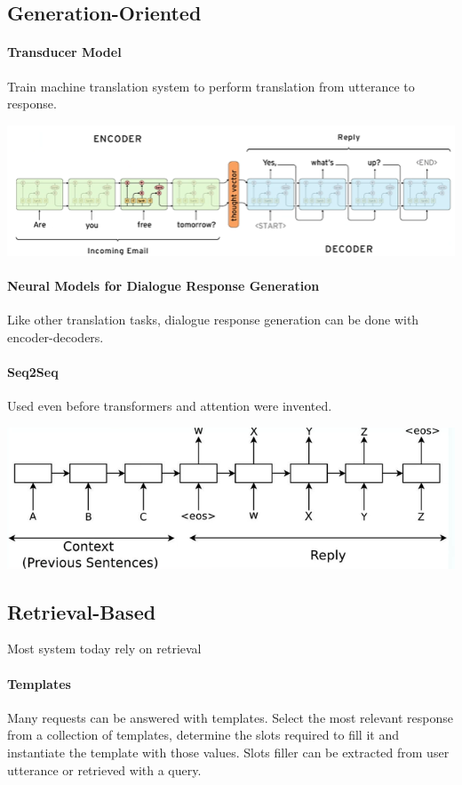 \documentclass[10pt]{report}
\begin{document}
\subsection{Generation-Oriented}
\paragraph{Transducer Model} Train machine translation system to perform translation from utterance to response.
\begin{center}
	\includegraphics[scale=0.5]{121.png}
\end{center}
\paragraph{Neural Models for Dialogue Response Generation} Like other translation tasks, dialogue response generation can be done with encoder-decoders.
\paragraph{Seq2Seq} Used even before transformers and attention were invented.
\begin{center}
	\includegraphics[scale=0.5]{122.png}
\end{center}
\subsection{Retrieval-Based}
Most system today rely on retrieval
\paragraph{Templates} Many requests can be answered with templates. Select the most relevant response from a collection of templates, determine the slots required to fill it and instantiate the template with those values. Slots filler can be extracted from user utterance or retrieved with a query.
\end{document}
